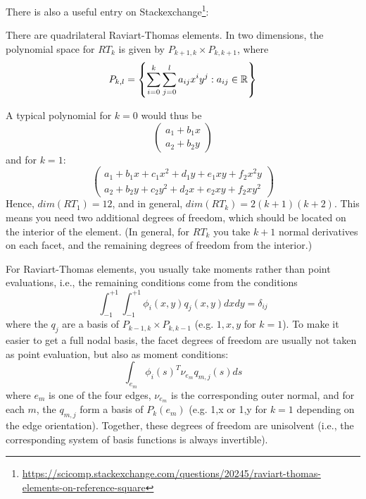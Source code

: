 There is also a useful entry on Stackexchange\footnote{\url{
https://scicomp.stackexchange.com/questions/20245/raviart-thomas-elements-on-reference-square}}:
\begin{displayquote}
{\color{darkgray}
There are quadrilateral Raviart-Thomas elements. 
In two dimensions, the polynomial space for $RT_k$ is given by 
$P_{k+1,k} \times P_{k,k+1}$, where
\[
P_{k,l}=\left\{ \sum_{i=0}^{k} \sum_{j=0}^{l} a_{ij} x^i y^j: a_{ij}\in {\mathbb{R}}  \right\}
\]

A typical polynomial for $k=0$ would thus be 
\[
\left(
\begin{array}{c}
a_1+b_1 x \\
a_2+b_2 y
\end{array}
\right)
\]
and for $k=1$:
\[
\left(
\begin{array}{c}
a_1+b_1 x +c_1x^2 +d_1 y + e_1 xy  + f_2 x^2 y\\
a_2+b_2 y +c_2y^2 +d_2 x + e_2 xy  + f_2 x y^2
\end{array}
\right)
\]
Hence, $dim(RT_1)=12$, and in general, $dim(RT_k)=2(k+1)(k+2)$. 
This means you need two additional degrees of freedom, which should be located on the 
interior of the element. (In general, for $RT_k$ you take $k+1$ normal derivatives on each facet, 
and the remaining degrees of freedom from the interior.)

For Raviart-Thomas elements, you usually take moments rather than 
point evaluations, i.e., the remaining conditions come from the conditions 
\[
\int_{-1}^{+1} \int_{-1}^{+1} \phi_i(x,y)q_j(x,y)dx dy = \delta_{ij}
\]
where the ${q_j}$ are a basis of $P_{k-1,k}\times P_{k,k-1}$ (e.g. $1,x,y$ for $k=1$).
To make it easier to get a full nodal basis, the facet degrees of freedom are 
usually not taken as point evaluation, but also as moment conditions: 
\[
\int_{e_m} \phi_i(s)^T \nu_{e_m} q_{m,j}(s) ds
\]
where $e_m$ is one of the four edges, $\nu_{e_m}$ is the corresponding outer normal, 
and for each $m$, the $q_{m,j}$ form a basis of $P_k(e_m)$ (e.g. {1,x} or {1,y}
for $k=1$ depending on the edge orientation).
Together, these degrees of freedom are unisolvent (i.e., the corresponding system 
of basis functions is always invertible).
}
\end{displayquote}



